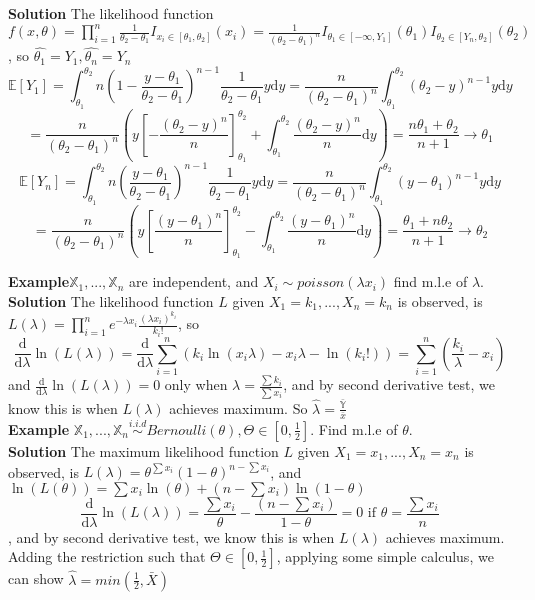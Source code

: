 \textbf{Solution} The likelihood function $f(x, \theta) = \prod_{i=1}^n \frac{1}{\theta_2 - \theta_1}I_{x_i\in[\theta_1, \theta_2]}(x_i) = \frac{1}{(\theta_2 - \theta_1)^n}I_{\theta_1\in[-\infty, Y_1]}(\theta_1)I_{\theta_2\in[Y_n, \theta_2]}(\theta_2) $, so $\hat{\theta_1} = Y_1, \hat{\theta_n} = Y_n$\\
$$\mathbb{E}[Y_1] = \int_{\theta_1}^{\theta_2} n(1-\frac{y-\theta_1}{\theta_2-\theta_1})^{n-1}\frac{1}{\theta_2-\theta_1}y \mathrm{d}y = \frac{n}{(\theta_2-\theta_1)^n}\int_{\theta_1}^{\theta_2} (\theta_2-y)^{n-1}y\mathrm{d}y$$
$$= \frac{n}{(\theta_2-\theta_1)^n}( y[-\frac{(\theta_2-y)^n}{n}]_{\theta_1}^{\theta_2} + \int_{\theta_1}^{\theta_2}\frac{(\theta_2-y)^n}{n}\mathrm{d}y) = \frac{n\theta_1+\theta_2}{n+1}\to\theta_1$$
$$\mathbb{E}[Y_n] = \int_{\theta_1}^{\theta_2} n(\frac{y-\theta_1}{\theta_2-\theta_1})^{n-1}\frac{1}{\theta_2-\theta_1}y \mathrm{d}y = \frac{n}{(\theta_2-\theta_1)^n}\int_{\theta_1}^{\theta_2} (y-\theta_1)^{n-1}y\mathrm{d}y$$
$$= \frac{n}{(\theta_2-\theta_1)^n}( y[\frac{(y-\theta_1)^n}{n}]_{\theta_1}^{\theta_2} - \int_{\theta_1}^{\theta_2}\frac{(y-\theta_1)^n}{n}\mathrm{d}y) = \frac{\theta_1+n\theta_2}{n+1}\to\theta_2$$

\textbf{Example}$\mathbb{X}_1, ..., \mathbb{X}_n  $ are independent, and $X_i\sim poisson(\lambda x_i)$ find m.l.e of $\lambda$.\\

\textbf{Solution} The likelihood function $L$ given $X_1 = k_1, ..., X_n = k_n$ is observed, is $L(\lambda) = \prod_{i=1}^n e^{-\lambda x_i}\frac{(\lambda x_i)^{k_i}}{k_i!}$, so 
$$\frac{\mathrm{d}}{\mathrm{d}\lambda}\ln(L(\lambda)) = \frac{\mathrm{d}}{\mathrm{d}\lambda}\sum_{i=1}^n (k_i\ln(x_i\lambda)-x_i\lambda-\ln(k_i!)) = \sum_{i=1}^n(\frac{k_i}{\lambda}-x_i)$$ and $\frac{\mathrm{d}}{\mathrm{d}\lambda}\ln(L(\lambda)) = 0$ only when $\lambda = \frac{\sum k_i}{\sum x_i}$, and by second derivative test, we know this is when $L(\lambda)$ achieves maximum. So $\hat{\lambda} = \frac{\bar{\mathbb{Y}}}{\bar{x}}$\\

\textbf{Example} $\mathbb{X}_1, ..., \mathbb{X}_n \overset{i.i.d}{\sim} Bernoulli(\theta), \Theta \in [0, \frac{1}{2}]$. Find m.l.e of $\theta$.\\

\textbf{Solution} The maximum likelihood function $L$ given $X_1 = x_1, ..., X_n = x_n$ is observed, is $L(\lambda) = \theta^{\sum x_i} (1-\theta)^{n-\sum x_i}$, and $\ln(L(\theta)) = \sum x_i \ln(\theta) + (n-\sum x_i)\ln(1-\theta)$
$$\frac{\mathrm{d}}{\mathrm{d}\lambda}\ln(L(\lambda)) = \frac{\sum x_i}{\theta} - \frac{(n-\sum x_i)}{1-\theta} = 0 \text{ if } \theta = \frac{\sum x_i}{n}$$
, and by second derivative test, we know this is when $L(\lambda)$ achieves maximum. Adding the restriction such that $\Theta \in [0, \frac{1}{2}]$, applying some simple calculus, we can show $\hat{\lambda} = min( \frac{1}{2}, \bar{X} )$
\\

